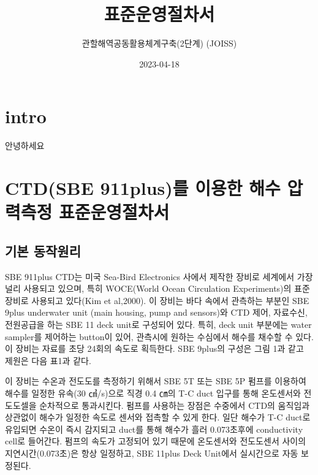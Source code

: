 \documentclass[
]{book}
\title{표준운영절차서}
\author{관할해역공동활용체계구축(2단계) (JOISS)}
\date{2023-04-18}
\begin{document}
\maketitle

{
\setcounter{tocdepth}{1}
\tableofcontents
}
\hypertarget{intro}{%
\chapter{intro}\label{intro}}

안녕하세요

\hypertarget{ctdsbe-911plusuxb97c-uxc774uxc6a9uxd55c-uxd574uxc218-uxc555uxb825uxce21uxc815-uxd45cuxc900uxc6b4uxc601uxc808uxcc28uxc11c}{%
\chapter{CTD(SBE 911plus)를 이용한 해수 압력측정 표준운영절차서}\label{ctdsbe-911plusuxb97c-uxc774uxc6a9uxd55c-uxd574uxc218-uxc555uxb825uxce21uxc815-uxd45cuxc900uxc6b4uxc601uxc808uxcc28uxc11c}}

\hypertarget{uxae30uxbcf8-uxb3d9uxc791uxc6d0uxb9ac}{%
\section{기본 동작원리}\label{uxae30uxbcf8-uxb3d9uxc791uxc6d0uxb9ac}}

SBE 911plus CTD는 미국 Sea-Bird Electronics 사에서 제작한 장비로 세계에서 가장 널리 사용되고 있으며, 특히 WOCE(World Ocean Circulation Experiments)의 표준장비로 사용되고 있다(Kim et al,2000). 이 장비는 바다 속에서 관측하는 부분인 SBE 9plus underwater unit (main housing, pump and sensors)와 CTD 제어, 자료수신, 전원공급을 하는 SBE 11 deck unit로 구성되어 있다. 특히, deck unit 부분에는 water sampler를 제어하는 button이 있어, 관측시에 원하는 수심에서 해수를 채수할 수 있다. 이 장비는 자료를 초당 24회의 속도로 획득한다. SBE 9plus의 구성은 그림 1과 같고 제원은 다음 표1과 같다.

이 장비는 수온과 전도도를 측정하기 위해서 SBE 5T 또는 SBE 5P 펌프를 이용하여 해수를 일정한 유속(30 ㎤/s)으로 직경 0.4 ㎝의 T-C duct 입구를 통해 온도센서와 전도도셀을 순차적으로 통과시킨다. 펌프를 사용하는 장점은 수중에서 CTD의 움직임과 상관없이 해수가 일정한 속도로 센서와 접촉할 수 있게 한다. 일단 해수가 T-C duct로 유입되면 수온이 즉시 감지되고 duct를 통해 해수가 흘러 0.073초후에 conductivity cell로 들어간다. 펌프의 속도가 고정되어 있기 때문에 온도센서와 전도도센서 사이의 지연시간(0.073초)은 항상 일정하고, SBE 11plus Deck Unit에서 실시간으로 자동 보정된다.
\end{document}
